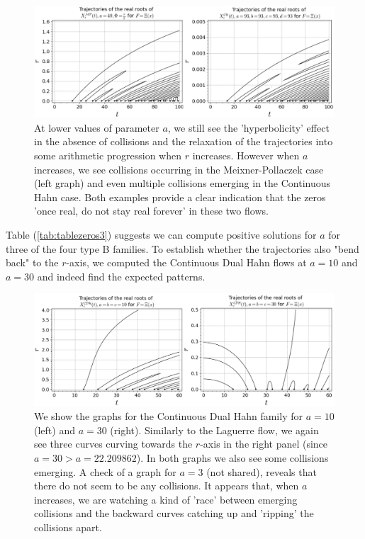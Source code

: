 \documentclass[a4paper,11pt,twoside]{amsart}
\begin{document}
\begin{figure}[H]
  \includegraphics[width=1\linewidth]{MeixPollContHahnbreak.jpg}
  \caption{At lower values of parameter $a$, we still see the 'hyperbolicity' effect in the absence of collisions and the relaxation of the trajectories into some arithmetic progression when $r$ increases. However when $a$ increases, we see collisions occurring in the Meixner-Pollaczek case (left graph) and even multiple collisions emerging in the Continuous Hahn case. Both examples provide a clear indication that the zeros 'once real, do not stay real forever' in these two flows.}
  \label{fig:MeixHyperbFail}
\end{figure}

Table (\ref{tab:tablezeros3}) suggests we can compute positive solutions for $a$ for three of the four type B families. To establish whether the trajectories also "bend back" to the $r$-axis, we computed the Continuous Dual Hahn flows at $a=10$ and $a=30$ and indeed find the expected patterns.

\begin{figure}[H]
  \includegraphics[width=0.9\linewidth]{ContDualHahncolls.jpg}
  \caption{We show the graphs for the Continuous Dual Hahn family for $a=10$ (left) and $a=30$ (right). Similarly to the Laguerre flow, we again see three curves curving towards the $r$-axis in the right panel (since $a=30 > a=22.209862$). In both graphs we also see some collisions emerging. A check of a graph for $a=3$ (not shared), reveals that there do not seem to be any collisions. It appears that, when $a$ increases, we are watching a kind of 'race' between emerging collisions and the backward curves catching up and 'ripping' the collisions apart.}
  \label{fig:ContHahnCurved}
\end{figure}
\end{document}
